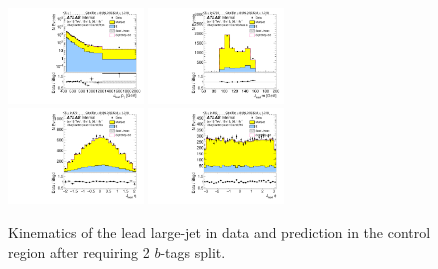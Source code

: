 \clearpage

\begin{figure}[htbp!]
\begin{center}
\includegraphics[width=0.32\textwidth,angle=-90]{figures/boosted/Control/b77_TwoTag_split_Control_leadHCand_Pt_m_1.pdf}
\includegraphics[width=0.32\textwidth,angle=-90]{figures/boosted/Control/b77_TwoTag_split_Control_leadHCand_Mass_s.pdf}\\
\includegraphics[width=0.32\textwidth,angle=-90]{figures/boosted/Control/b77_TwoTag_split_Control_leadHCand_Eta.pdf}
\includegraphics[width=0.32\textwidth,angle=-90]{figures/boosted/Control/b77_TwoTag_split_Control_leadHCand_Phi.pdf}
  \caption{Kinematics of the lead large-\R jet in data and prediction in the control region after requiring 2 $b$-tags split. }
  \label{fig:boosted-2bs-control-ak10-lead}
\end{center}
\end{figure}


